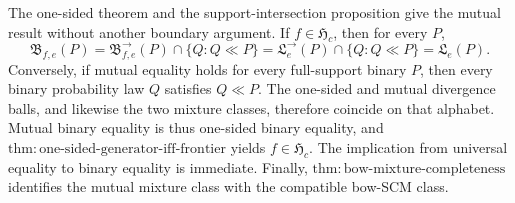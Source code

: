 The one-sided theorem and the support-intersection proposition give the mutual result without another boundary argument.  If \(f\in\mathfrak H_c\), then for every \(P\),
\[
 \mathfrak B_{f,e}(P)
 =\mathfrak B^{\to}_{f,e}(P)\cap\{Q:Q\ll P\}
 =\mathfrak L^{\to}_e(P)\cap\{Q:Q\ll P\}
 =\mathfrak L_e(P).
\]
Conversely, if mutual equality holds for every full-support binary \(P\), then every binary probability law \(Q\) satisfies \(Q\ll P\).  The one-sided and mutual divergence balls, and likewise the two mixture classes, therefore coincide on that alphabet.  Mutual binary equality is thus one-sided binary equality, and \(\mathrm{thm:one\text{-}sided\text{-}generator\text{-}iff\text{-}frontier}\) yields \(f\in\mathfrak H_c\).  The implication from universal equality to binary equality is immediate.  Finally, \(\mathrm{thm:bow\text{-}mixture\text{-}completeness}\) identifies the mutual mixture class with the compatible bow-SCM class.